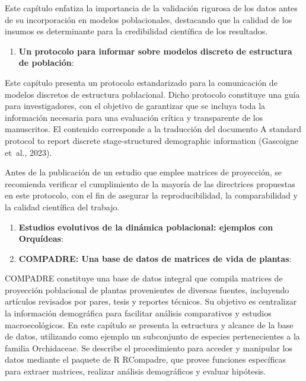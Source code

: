 \documentclass[
  12pt,
  letterpaper,
]{book}
\providecommand{\tightlist}{%
  \setlength{\itemsep}{0pt}\setlength{\parskip}{0pt}}\usepackage{longtable,booktabs,array}
\begin{document}
Este capítulo enfatiza la importancia de la validación rigurosa de los
datos antes de su incorporación en modelos poblacionales, destacando que
la calidad de los insumos es determinante para la credibilidad
científica de los resultados.

\begin{enumerate}
\def\labelenumi{\arabic{enumi}.}
\setcounter{enumi}{14}
\tightlist
\item
  \textbf{Un protocolo para informar sobre modelos discreto de
  estructura de población}:
\end{enumerate}

Este capítulo presenta un protocolo estandarizado para la comunicación
de modelos discretos de estructura poblacional. Dicho protocolo
constituye una guía para investigadores, con el objetivo de garantizar
que se incluya toda la información necesaria para una evaluación crítica
y transparente de los manuscritos. El contenido corresponde a la
traducción del documento A standard protocol to report discrete
stage-structured demographic information (Gascoigne et~al., 2023).

Antes de la publicación de un estudio que emplee matrices de proyección,
se recomienda verificar el cumplimiento de la mayoría de las directrices
propuestas en este protocolo, con el fin de asegurar la
reproducibilidad, la comparabilidad y la calidad científica del trabajo.

\begin{enumerate}
\def\labelenumi{\arabic{enumi}.}
\setcounter{enumi}{15}
\item
  \textbf{Estudios evolutivos de la dinámica poblacional: ejemplos con
  Orquídeas}:
\item
  \textbf{COMPADRE: Una base de datos de matrices de vida de plantas}:
\end{enumerate}

COMPADRE constituye una base de datos integral que compila matrices de
proyección poblacional de plantas provenientes de diversas fuentes,
incluyendo artículos revisados por pares, tesis y reportes técnicos. Su
objetivo es centralizar la información demográfica para facilitar
análisis comparativos y estudios macroecológicos. En este capítulo se
presenta la estructura y alcance de la base de datos, utilizando como
ejemplo un subconjunto de especies pertenecientes a la familia
Orchidaceae. Se describe el procedimiento para acceder y manipular los
datos mediante el paquete de R RCompadre, que provee funciones
específicas para extraer matrices, realizar análisis demográficos y
evaluar hipótesis.
\end{document}
